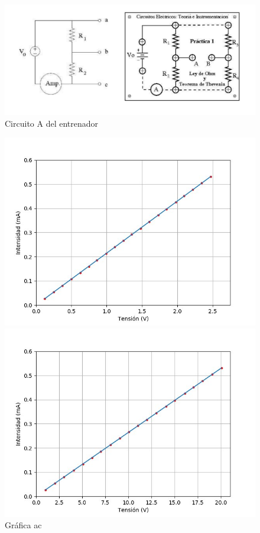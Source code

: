 \documentclass[a4paper,11pt]{article}
\begin{document}
\begin{figure}[hbtp]
\centering
\includegraphics[scale=0.5]{Imagenes/Entrenador.png}
\caption{Circuito A del entrenador}
\end{figure}
\begin{figure}[hbtp]
\centering
\includegraphics[scale=0.5]{Imagenes/Grafica_ac.jpg}
\caption{Gráfica ac}
\includegraphics[scale=0.5]{Imagenes/Grafica_ab.jpg}

\end{figure}
\end{document}
